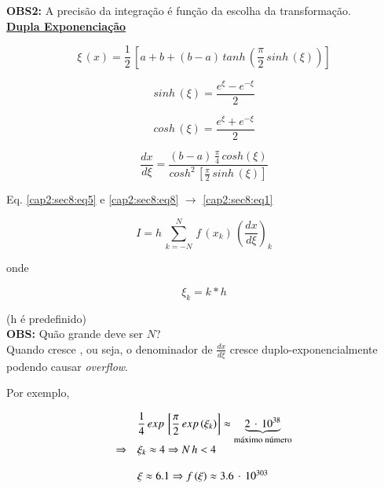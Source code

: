 \textbf{OBS2:} A precisão da integração é função da escolha da transformação.\\

\underline{\textbf{Dupla Exponenciação}}

\begin{equation}
 \label{cap2:sec8:eq5}
 \xi\,(x) = \frac{1}{2} \, \left[ a + b + (b - a) \, tanh \, \left( \frac{\pi}{2} \, sinh\,(\xi) \right) \right]
\end{equation}

\begin{equation}
 \label{cap2:sec8:eq6}
 sinh\,(\xi) = \frac{e^\xi - e^{-\xi}}{2}
\end{equation}

\begin{equation}
 \label{cap2:sec8:eq7}
 cosh\,(\xi) = \frac{e^\xi + e^{-\xi}}{2}
\end{equation}

\begin{equation}
 \label{cap2:sec8:eq8}
 \frac{dx}{d\xi} = \frac{(b-a) \, \displaystyle \frac{\pi}{4} \, cosh(\xi)}{cosh^2 \, \left[ \displaystyle \frac{\pi}{2} \, sinh\,(\xi) \right]}
\end{equation}

Eq. \ref{cap2:sec8:eq5} e \ref{cap2:sec8:eq8} $\rightarrow$ \ref{cap2:sec8:eq1}

\begin{equation}
 \label{cap2:sec8:eq9}
 I = h \, \sum_{k=-N}^N \, f\,(x_k) \, \left( \frac{dx}{d\xi} \right)_k
\end{equation}

onde

\[\xi_{k} = k \ast h\]

(h é predefinido)\\

\textbf{OBS:} Quão grande deve ser $N$?\\

Quando  cresce , ou seja, o denominador de $ \displaystyle \frac{dx}{d\xi}$ cresce duplo-exponencialmente podendo causar \textit{overflow}.

Por exemplo,

\[
 \begin{array}{ll}
  & \displaystyle \frac{1}{4} \, exp\,\left[ \frac{\pi}{2} \, exp\,(\xi_k) \right] \approx \underbrace{2 \, \cdot \, 10^{38}}_{\footnotesize{\mbox{máximo número}}} \\
  \Rightarrow & \xi_k \approx 4 \Rightarrow N\,h < 4 \\
  & \\
  & \xi \approx 6.1 \Rightarrow f\,(\xi) \approx 3.6 \, \cdot \, 10^{303}
 \end{array}
\]

